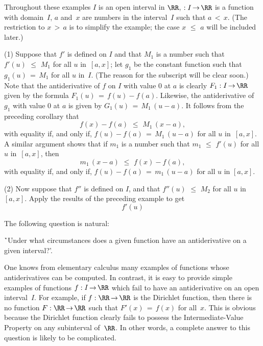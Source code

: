 {\V

        Throughout these examples $I$ is an open interval in ${\RR}$, $:I \,{\rightarrow}\, {\RR}$ is a function with domain~$I$,
    $a$ and~$x$ are numbers in the interval~$I$ such that $a\,<\,x$. (The restriction to $x\,>\,a$ is to simplify the example;
    the case $x\,\,{\leq}\,\,a$ will be included later.)

\V

        (1) Suppose that $f'$ is defined on $I$ and that $M_{1}$ is a number such that $f'(u)\,\,{\leq}\,\,M_{1}$ for all $u$ in~$[a,x]$;
    let $g_{1}$ be the constant function such that $g_{1}(u) \,=\, M_{1}$ for all $u$ in~$I$. (The reason for the subscript will be clear soon.)
    Note that the antiderivative of $f$ on $I$ with value $0$ at $a$ is clearly $F_{1}:I \,{\rightarrow}\, {\RR}$ given by the formula $F_{1}(u) \,=\, f(u)-f(a)$.
    Likewise, the antiderivative of $g_{1}$ with value $0$ at $a$ is given by $G_{1}(u) \,=\, M_{1}\,(u-a)$.
    It follows from the preceding corollary that
        \begin{displaymath}
        f(x) - f(a)\,\,{\leq}\,\,M_{1}\,(x-a),
        \end{displaymath}
    with equality if, and only if, $f(u)-f(a) \,=\, M_{1}\,(u-a)$ for all $u$ in~$[a,x]$.
    A similar argument shows that if $m_{1}$ is a number such that $m_{1}\,\,{\leq}\,\,f'(u)$ for all $u$ in~$[a,x]$, then
        \begin{displaymath}
        m_{1}\,(x-a)\,\,{\leq}\,\,f(x) - f(a),
        \end{displaymath}
    with equality if, and only if, $f(u)-f(a) \,=\, m_{1}\,(u-a)$ for all $u$ in $[a,x]$.

\V

        (2) Now suppose that $f''$ is defined on $I$, and that $f''(u)\,\,{\leq}\,\,M_{2}$ for all $u$ in~$[a,x]$.
    Apply the results of the preceding example to get
        \begin{displaymath}
        f'(u)
        \end{displaymath}



        The following question is natural:

\VA

        \h `Under what circumstances does a given function have an antiderivative on a given interval?'.

\VA

\noindent One knows from elementary calculus many examples of functions whose antiderivatives can be computed.
    In contrast, it is easy to provide simple examples of functions $f:I \,{\rightarrow}\, {\RR}$
    which fail to have an antiderivative on an open interval~$I$. For example, if $f:{\RR} \,{\rightarrow}\, {\RR}$ is the Dirichlet function,
    then there is no function $F:{\RR} \,{\rightarrow}\, {\RR}$ such that $F'(x) \,=\, f(x)$ for all~$x$.
    This is obvious because the Dirichlet function clearly fails to possess the Intermediate-Value Property on any subinterval of~${\RR}$.
    In other words, a complete answer to this question is likely to be complicated.

}
